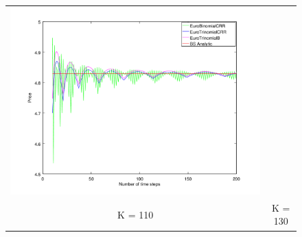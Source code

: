 \documentclass[12pt,a4paper,hidelinks,fleqn]{article}            %
\begin{document}
\begin{figure}
\begin{tabular}{cc}
\includegraphics[scale=0.4]{ex2_130} \\
K = 110 & K = 130 \\
\end{tabular}
\end{figure}
\end{document}
